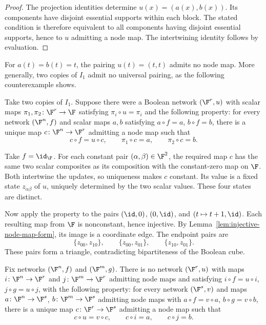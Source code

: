 \begin{proof}
The projection identities determine $u(x)=(a(x),b(x))$. Its components have disjoint essential supports within each block. The stated condition is therefore equivalent to all components having disjoint essential supports, hence to $u$ admitting a node map. The intertwining identity follows by evaluation.
\end{proof}

For $a(t)=b(t)=t$, the pairing $u(t)=(t,t)$ admits no node map. More generally, two copies of $I_1$ admit no universal pairing, as the following counterexample shows.

\begin{counterexample}\label{ex:no-universal-pairing}
Take two copies of $I_1$. Suppose there were a Boolean network $(\F^r,u)$ with scalar maps $\pi_1,\pi_2\colon\F^r\to\F$ satisfying $\pi_i\circ u=\pi_i$ and the following property: for every network $(\F^n,f)$ and scalar maps $a,b$ satisfying $a\circ f=a$, $b\circ f=b$, there is a unique map $c\colon\F^n\to\F^r$ admitting a node map such that
\[
    c\circ f=u\circ c,\qquad \pi_1\circ c=a,
    \qquad \pi_2\circ c=b.
\]

Take $f=\id_{\F}$. For each constant pair $(\alpha,\beta)\in\F^2$, the required map $c$ has the same two scalar composites as its composition with the constant-zero map on $\F$. Both intertwine the updates, so uniqueness makes $c$ constant. Its value is a fixed state $z_{\alpha\beta}$ of $u$, uniquely determined by the two scalar values. These four states are distinct.

Now apply the property to the pairs $(\id,0)$, $(0,\id)$, and $(t\mapsto t+1,\id)$. Each resulting map from $\F$ is nonconstant, hence injective. By Lemma~\ref{lem:injective-node-map-form}, its image is a coordinate edge. The endpoint pairs are
\[
    \{z_{00},z_{10}\},\qquad
    \{z_{00},z_{01}\},\qquad
    \{z_{10},z_{01}\}.
\]
These pairs form a triangle, contradicting bipartiteness of the Boolean cube.
\end{counterexample}

\begin{proposition}\label{prop:no-universal-extension}
Fix networks $(\F^n,f)$ and $(\F^m,g)$. There is no network $(\F^r,u)$ with maps $i\colon\F^n\to\F^r$ and $j\colon\F^m\to\F^r$ admitting node maps and satisfying $i\circ f=u\circ i$, $j\circ g=u\circ j$, with the following property: for every network $(\F^s,v)$ and maps $a\colon\F^n\to\F^s$, $b\colon\F^m\to\F^s$ admitting node maps with $a\circ f=v\circ a$, $b\circ g=v\circ b$, there is a unique map $c\colon\F^r\to\F^s$ admitting a node map such that
\[
    c\circ u=v\circ c,\qquad c\circ i=a,
    \qquad c\circ j=b.
\]
\end{proposition}


